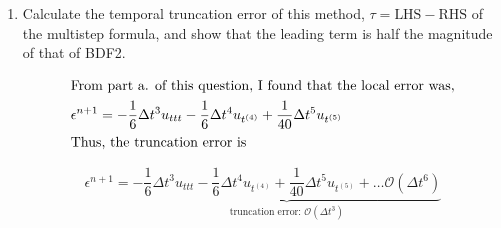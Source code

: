 \pagebreak
\begin{enumerate}[label=\alph*., start = 3]
    \item Calculate the temporal truncation error of this method, $\tau= \text{LHS} - \text{RHS}$ of the multistep formula, and show that the leading term is half the magnitude of that of BDF2.    
    

    \vspace{-0.35in}
    \begin{align*}
        \shortintertext{From part a. of this question, I found that the local error was,}
        \epsilon^{n+1} & = -\frac{1}{6}\Delta t^3u_{ttt} - \frac{1}{6}\Delta t^4u_{t^{(4)}} + \frac{1}{40}\Delta t^5u_{t^{(5)}}\\
        \shortintertext{Thus, the truncation error is}
    \end{align*}

    \vspace{-0.5in}
    \begin{equation*}
        \boxed{\epsilon^{n+1} = \underbrace{-\frac{1}{6}\Delta t^3u_{ttt} - \frac{1}{6}\Delta t^4u_{t^{(4)}} + \frac{1}{40}\Delta t^5u_{t^{(5)}} + \ldots \mathcal{O}(\Delta t^6)}_{\text{truncation error: $\mathcal{O}(\Delta t^3)$}}}
    \end{equation*}


\end{enumerate}
